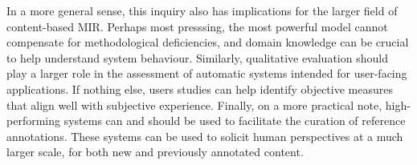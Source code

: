 \documentclass{article}
\begin{document}
In a more general sense, this inquiry also has implications for the larger field of content-based MIR.
Perhaps most presssing, the most powerful model cannot compensate for methodological deficiencies, and domain knowledge can be crucial to help understand system behaviour.
Similarly, qualitative evaluation should play a larger role in the assessment of automatic systems intended for user-facing applications.
If nothing else, users studies can help identify objective measures that align well with subjective experience.
Finally, on a more practical note, high-performing systems can and should be used to facilitate the curation of reference annotations.
These systems can be used to solicit human perspectives at a much larger scale, for both new and previously annotated content.



\end{document}
